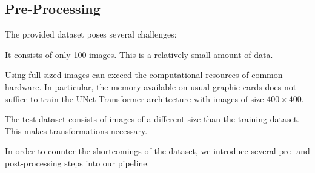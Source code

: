\documentclass[10pt,conference,compsocconf]{IEEEtran}
\begin{document}
\subsection{Pre-Processing}

The provided dataset poses several challenges:
\begin{enumerate*}[label=(\arabic*)]
  \item It consists of only 100 images. This is a relatively small amount of data.
  \item Using full-sized images can exceed the computational resources of common hardware. In particular, the memory available on usual graphic cards does not suffice to train the UNet Transformer architecture \cite{Petit2021} with images of size $400\times 400$.
  \item The test dataset consists of images of a different size than the training dataset. This makes transformations necessary.
\end{enumerate*} 

In order to counter the shortcomings of the dataset, we introduce several pre- and post-processing steps into our pipeline.
\end{document}
